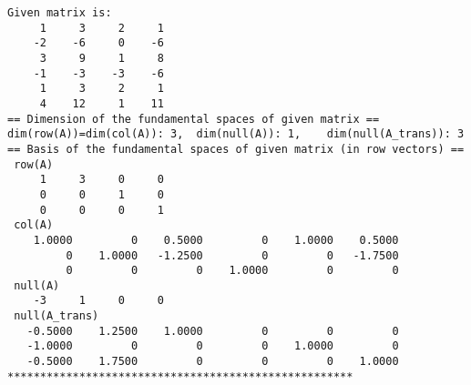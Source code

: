 \begin{sol}
\begin{enumerate}
\begin{outputs}
\begin{verbatim}
Given matrix is:
     1     3     2     1
    -2    -6     0    -6
     3     9     1     8
    -1    -3    -3    -6
     1     3     2     1
     4    12     1    11
== Dimension of the fundamental spaces of given matrix ==
dim(row(A))=dim(col(A)): 3,	 dim(null(A)): 1,	 dim(null(A_trans)): 3
== Basis of the fundamental spaces of given matrix (in row vectors) ==
 row(A)
     1     3     0     0
     0     0     1     0
     0     0     0     1
 col(A)
    1.0000         0    0.5000         0    1.0000    0.5000
         0    1.0000   -1.2500         0         0   -1.7500
         0         0         0    1.0000         0         0
 null(A)
    -3     1     0     0
 null(A_trans)
   -0.5000    1.2500    1.0000         0         0         0
   -1.0000         0         0         0    1.0000         0
   -0.5000    1.7500         0         0         0    1.0000
*****************************************************
\end{verbatim}
\end{outputs}
\end{enumerate}
\end{sol}

\vspace{3mm}


